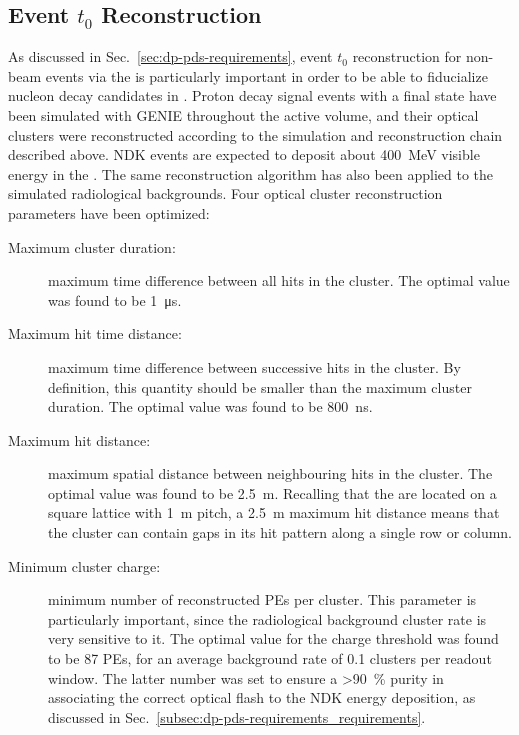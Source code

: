 

\subsection{Event $t_{0}$ Reconstruction}

As discussed in Sec.~\ref{sec:dp-pds-requirements}, event $t_0$ reconstruction for non-beam events via the  is particularly important in order to be able to fiducialize nucleon decay candidates in . Proton decay signal events with a \ptoknubar final state have been simulated with GENIE \cite{Andreopoulos:2009rq} throughout the   active volume, and their optical clusters were reconstructed according to the simulation and reconstruction chain described above. NDK events are expected to deposit about \SI{400}{\MeV} visible energy in the \lar. The same reconstruction algorithm has also been applied to the simulated radiological backgrounds. Four optical cluster reconstruction parameters have been optimized:
\begin{description}
\item[Maximum cluster duration:] maximum time difference between all  hits in the cluster. The optimal value was found to be \SI{1}{\us}.
\item[Maximum hit time distance:] maximum time difference between successive  hits in the cluster. By definition, this quantity should be smaller than the maximum cluster duration. The optimal value was found to be \SI{800}{\ns}.
\item[Maximum hit distance:] maximum spatial distance between neighbouring  hits in the cluster. The optimal value was found to be \SI{2.5}{\m}. Recalling that the  are located on a square lattice with \SI{1}{\m} pitch, a \SI{2.5}{\m} maximum hit distance means that the cluster can contain gaps in its hit pattern along a single  row or column.
\item[Minimum cluster charge:] minimum number of reconstructed PEs per cluster. This parameter is particularly important, since the radiological background cluster rate is very sensitive to it. The optimal value for the charge threshold was found to be \num{87} PEs, for an average background  rate of \num{0.1} clusters per \dpreadout readout window. The latter number was set to ensure a \SI{>90}{\%} purity in associating the correct optical flash to the NDK energy deposition, as discussed in Sec.~\ref{subsec:dp-pds-requirements_requirements}.
\end{description} 

